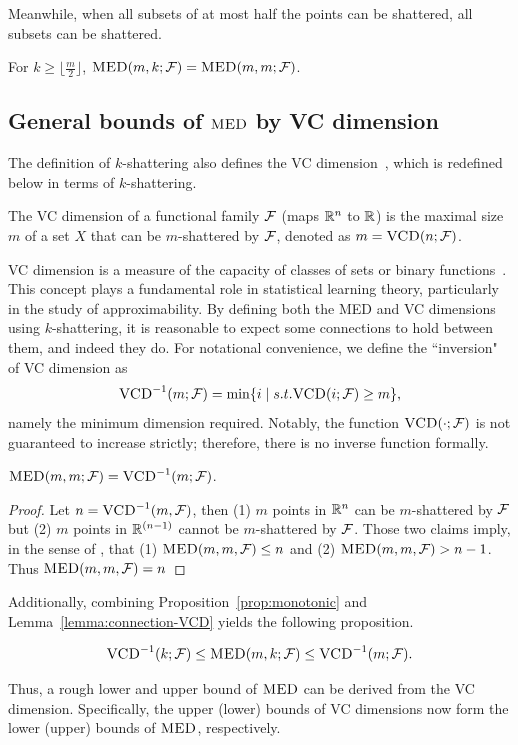 Meanwhile, when all subsets of at most half the points can be shattered, all subsets can be shattered.
\begin{proposition}\label{prop:half-shatter}
    For $k\geq \lfloor \frac{m}{2} \rfloor$, $\textsc{MED}(m, k;\mathcal{F}) = \textsc{MED}(m, m;\mathcal{F})$.
\end{proposition}


\subsection{General bounds of $\textsc{MED}$ by VC dimension}

The definition of $k$-shattering also defines the VC dimension~\citep{mohri2018foundations}, which is redefined below in terms of $k$-shattering.
\begin{definition}[VC dimension]
    The VC dimension of a functional family $\mathcal{F}$ (maps $\mathbb{R}^n$ to $\mathbb{R}$) is the maximal size $m$ of a set $X$ that can be $m$-shattered by $\mathcal{F}$, denoted as $m = \textsc{VCD}(n; \mathcal{F})$.
\end{definition}
VC dimension is a measure of the capacity of classes of sets or binary functions~\citep{vapnik2013nature}. This concept plays a fundamental role in statistical learning theory, particularly in the study of approximability. By defining both the MED and VC dimensions using $k$-shattering, it is reasonable to expect some connections to hold between them, and indeed they do. For notational convenience, we define the ``inversion" of VC dimension as $$\textsc{VCD}^{-1}(m; \mathcal{F})=\min \{i \mid s.t. \textsc{VCD}(i;\mathcal{F})\ge m\},$$ namely the minimum dimension required. Notably, the function $\textsc{VCD}(\cdot ;\mathcal{F})$ is not guaranteed to increase strictly; therefore, there is no inverse function formally.
\begin{lemma}\label{lemma:connection-VCD}
    $\textsc{MED}(m, m;\mathcal{F}) = \textsc{VCD}^{-1}(m;\mathcal{F})$.
\end{lemma}

\begin{proof}
    Let $n = \textsc{VCD}^{-1}(m, \mathcal{F})$, then (1) $m$ points in $\mathbb{R}^n$ can be $m$-shattered by $\mathcal{F}$ but (2) $m$ points in $\mathbb{R}^{(n-1)}$ cannot be $m$-shattered by $\mathcal{F}$. Those two claims imply, in the sense of \med, that (1) $\textsc{MED}(m, m, \mathcal{F}) \leq n$ and (2) $\textsc{MED}(m, m, \mathcal{F}) > n - 1$. Thus $\textsc{MED}(m, m, \mathcal{F}) = n$
\end{proof}


Additionally, combining Proposition~\ref{prop:monotonic} and Lemma~\ref{lemma:connection-VCD} yields the following proposition.
\begin{proposition}\label{prop:vc-bounds}
    $$\textsc{VCD}^{-1}(k; \mathcal{F}) \leq \textsc{MED}(m, k; \mathcal{F}) \leq \textsc{VCD}^{-1}(m; \mathcal{F}).$$
\end{proposition}
Thus, a rough lower and upper bound of $\textsc{MED}$ can be derived from the VC dimension. Specifically, the upper (lower) bounds of VC dimensions now form the lower (upper) bounds of $\textsc{MED}$, respectively.


